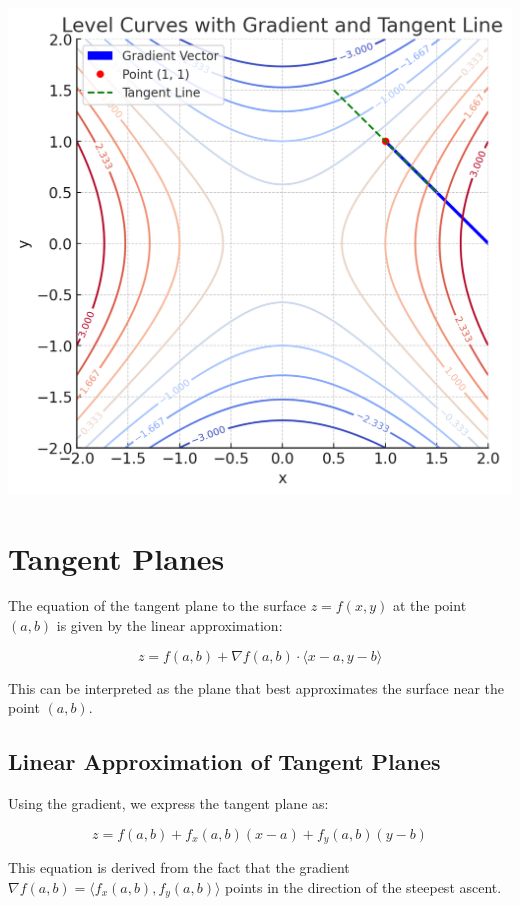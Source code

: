 \documentclass{report}
\begin{document}
\begin{center}
	\includegraphics[scale=0.5]{levelcurves.png}
\end{center}

\section*{Tangent Planes}

The equation of the tangent plane to the surface $z = f(x, y)$ at the point $(a, b)$ is given by the linear approximation:

\[
	z = f(a, b) + \nabla f(a, b) \cdot \langle x - a, y - b \rangle
\]

This can be interpreted as the plane that best approximates the surface near the point $(a, b)$.

\subsection{Linear Approximation of Tangent Planes}

Using the gradient, we express the tangent plane as:

\[
	z = f(a, b) + f_x(a, b)(x - a) + f_y(a, b)(y - b)
\]

This equation is derived from the fact that the gradient $\nabla f(a, b) = \langle f_x(a, b), f_y(a, b) \rangle$ points in the direction of the steepest ascent.
\end{document}
